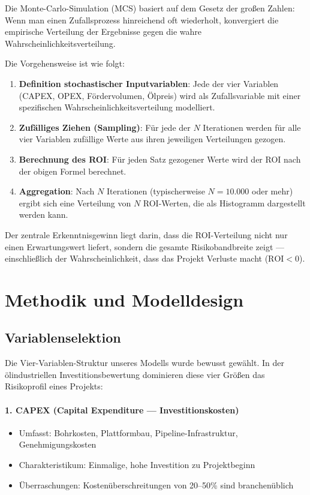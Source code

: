 \documentclass[12pt,a4paper]{article}
\begin{document}
Die Monte-Carlo-Simulation (MCS) basiert auf dem Gesetz der großen Zahlen: Wenn man einen Zufallsprozess hinreichend oft wiederholt, konvergiert die empirische Verteilung der Ergebnisse gegen die wahre Wahrscheinlichkeitsverteilung.

Die Vorgehensweise ist wie folgt:

\begin{enumerate}[label=\arabic*., itemsep=4pt]
  \item \textbf{Definition stochastischer Inputvariablen}: Jede der vier Variablen (CAPEX, OPEX, Fördervolumen, Ölpreis) wird als Zufallsvariable mit einer spezifischen Wahrscheinlichkeitsverteilung modelliert.
  \item \textbf{Zufälliges Ziehen (Sampling)}: Für jede der $N$ Iterationen werden für alle vier Variablen zufällige Werte aus ihren jeweiligen Verteilungen gezogen.
  \item \textbf{Berechnung des ROI}: Für jeden Satz gezogener Werte wird der ROI nach der obigen Formel berechnet.
  \item \textbf{Aggregation}: Nach $N$ Iterationen (typischerweise $N = 10.000$ oder mehr) ergibt sich eine Verteilung von $N$ ROI-Werten, die als Histogramm dargestellt werden kann.
\end{enumerate}

Der zentrale Erkenntnisgewinn liegt darin, dass die ROI-Verteilung nicht nur einen Erwartungswert liefert, sondern die gesamte Risikobandbreite zeigt — einschließlich der Wahrscheinlichkeit, dass das Projekt Verluste macht ($\text{ROI} < 0$).

\section{Methodik und Modelldesign}

\subsection{Variablenselektion}

Die Vier-Variablen-Struktur unseres Modells wurde bewusst gewählt. In der ölindustriellen Investitionsbewertung dominieren diese vier Größen das Risikoprofil eines Projekts:

\paragraph{1. CAPEX (Capital Expenditure — Investitionskosten)}
\begin{itemize}[itemsep=1pt]
  \item Umfasst: Bohrkosten, Plattformbau, Pipeline-Infrastruktur, Genehmigungskosten
  \item Charakteristikum: Einmalige, hohe Investition zu Projektbeginn
  \item Überraschungen: Kostenüberschreitungen von 20–50\% sind branchenüblich
\end{itemize}
\end{document}
